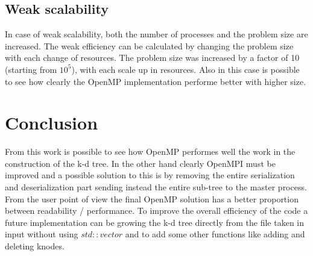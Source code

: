 \documentclass[11pt,a4paper]{article}
\begin{document}
\subsection{Weak scalability}
In case of weak scalability, both the number of processes and the problem size are increased. The weak efficiency can be calculated by changing the problem size with each change of resources. The problem size was increased by a factor of 10 (starting from $10^{5}$), with each scale up in resources. Also in this case is possible to see how clearly the OpenMP implementation performe better with higher size. 
\begin{figure}[H]
    \centering
\end{figure}
\begin{figure}[H]
    \centering
\end{figure}
\section{Conclusion}
From this work is possible to see how OpenMP performes well the work in the construction of the k-d tree. In the other hand clearly OpenMPI must be improved and a possible solution to this is by removing the entire serialization and deserialization part sending instead the entire sub-tree to the master process.
From the user point of view the final OpenMP solution has a better proportion between readability / performance. To improve the overall efficiency of the code a future implementation can be growing the k-d tree directly from the file taken in input without using $std::vector$ and to add some other functions like adding and deleting knodes. 
\end{document}
